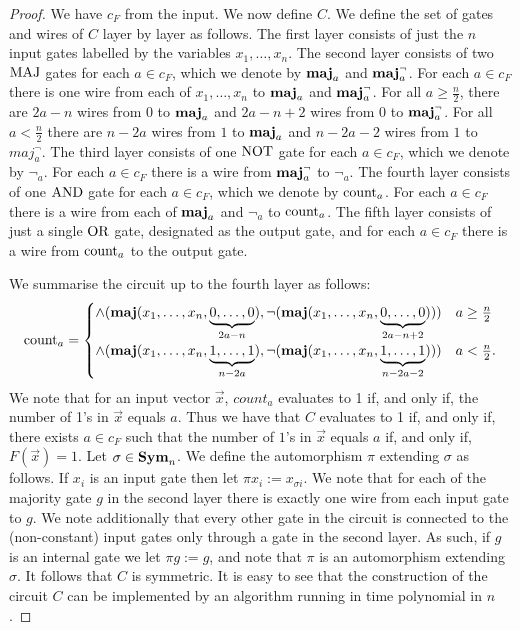 \documentclass[../paper.tex]{subfiles}
\begin{document}
\begin{proof}
  We have $c_{F}$ from the input. We now define $C$. We define the set of gates
  and wires of $C$ layer by layer as follows. The first layer consists of just
  the $n$ input gates labelled by the variables $x_1, \ldots , x_n$. The second
  layer consists of two $\text{\upshape MAJ}$ gates for each $a \in c_{F}$, which we denote by
  $\text{\textbf{maj}}_a$ and $\text{\textbf{maj}}^{\neg}_a$. For each $a \in c_{F}$ there is one wire from
  each of $x_1, \ldots , x_n$ to $\text{\textbf{maj}}_a$ and $\text{\textbf{maj}}^{\neg}_a$. For all $a \geq
  \frac{n}{2}$, there are $2a - n$ wires from $0$ to $\text{\textbf{maj}}_a$ and $2a - n + 2$
  wires from $0$ to $\text{\textbf{maj}}^{\neg}_a$. For all $a < \frac{n}{2}$ there are $n -
  2a$ wires from $1$ to $\text{\textbf{maj}}_a$ and $n - 2a - 2$ wires from $1$ to
  $maj^{\neg}_a$. The third layer consists of one $\text{\upshape NOT}$ gate for each $a \in
  c_{F}$, which we denote by $\neg_a$. For each $a \in c_{F}$ there is a wire
  from $\text{\textbf{maj}}^\neg_a$ to $\neg_a$. The fourth layer consists of one $\text{\upshape AND}$ gate
  for each $a \in c_{F}$, which we denote by $\text{count}_a$. For each $a \in
  c_{F}$ there is a wire from each of $\text{\textbf{maj}}_a$ and $\neg_a$ to $\text{count}_a$.
  The fifth layer consists of just a single $\text{\upshape OR}$ gate, designated as the output
  gate, and for each $a \in c_{F}$ there is a wire from $\text{count}_a$ to the
  output gate.

  We summarise the circuit up to the fourth layer as follows:
  \[
    \text{count}_a = \begin{cases} \land ( \text{\textbf{maj}} ( x_1, \ldots, x_n, \underbrace
      {0, \ldots, 0}_{2a - n} ), \neg ( \text{\textbf{maj}} (x_1, \ldots , x_n, \underbrace{0,
        \ldots,
        0}_{2a - n + 2} ) )) &  a \geq \frac{n}{2} \\
      \land ( \text{\textbf{maj}} ( x_1, \ldots, x_n, \underbrace {1, \ldots, 1}_{n - 2a} ),
      \neg ( \text{\textbf{maj}} ( x_1, \ldots , x_n, \underbrace{1, \ldots, 1}_{n - 2a -2} )
      )) & a < \frac{n}{2}.
    \end{cases}
  \]
  We note that for an input vector $\vec{x}$, $count_a$ evaluates to 1 if, and
  only if, the number of 1's in $\vec{x}$ equals $a$. Thus we have that $C$
  evaluates to 1 if, and only if, there exists $a \in c_{F}$ such that the
  number of $1$'s in $\vec{x}$ equals $a$ if, and only if, $F (\vec{x}) = 1$.
  Let $\sigma \in \text{\textbf{Sym}}_n$. We define the automorphism $\pi$ extending $\sigma$
  as follows. If $x_i$ is an input gate then let $\pi x_i := x_{\sigma i}$. We
  note that for each of the majority gate $g$ in the second layer there is
  exactly one wire from each input gate to $g$. We note additionally that every
  other gate in the circuit is connected to the (non-constant) input gates only
  through a gate in the second layer. As such, if $g$ is an internal gate we let
  $\pi g := g$, and note that $\pi$ is an automorphism extending $\sigma$. It
  follows that $C$ is symmetric. It is easy to see that the construction of the
  circuit $C$ can be implemented by an algorithm running in time polynomial in
  $n$.
  

\end{proof}
\end{document}
